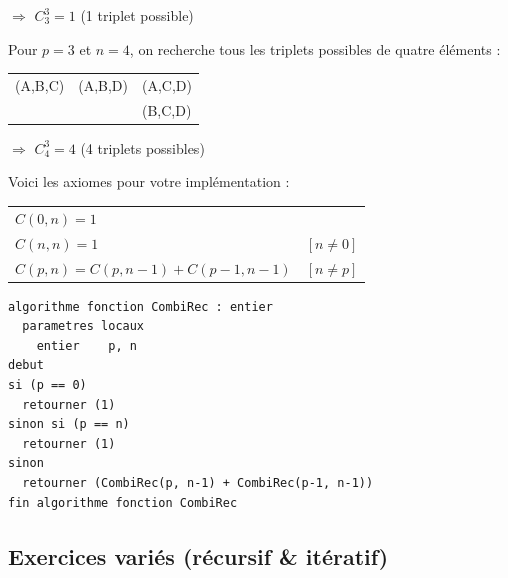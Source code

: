 \documentclass[11pt,a4paper]{article}
\begin{document}
\hspace*{3cm} $\Rightarrow$ $ C^{3}_{3} = 1 $ \hspace*{1cm} (1 triplet possible)

\bigskip

Pour $ p = 3 $ et $ n = 4 $, on recherche tous les triplets possibles de quatre éléments :

\begin{table}[h!]
  \centering
  \begin{tabular}{l l l}
(A,B,C) & (A,B,D) & (A,C,D) \\
        &         & (B,C,D) \\
  \end{tabular}
\end{table}

\hspace*{3cm} $\Rightarrow$ $ C^{3}_{4} = 4 $ \hspace*{1cm} (4 triplets possibles)

\bigskip

Voici les axiomes pour votre implémentation :

\begin{table}[h!]
  \centering
  \begin{tabular}{l l}
$ C(0,n) = 1 $                             & \\
$ C(n,n) = 1 $                             & $ [n \neq 0] $ \\
$ C(p,n) = C(p, n - 1) + C(p - 1, n - 1) $ & $ [n \neq p] $ \\
  \end{tabular}
\end{table}


\begin{table}[ht!]
  \centering
\begin{lstlisting}[style=algorithmique]
algorithme fonction CombiRec : entier
  parametres locaux
    entier    p, n
debut
si (p == 0)
  retourner (1)
sinon si (p == n)
  retourner (1)
sinon
  retourner (CombiRec(p, n-1) + CombiRec(p-1, n-1))
fin algorithme fonction CombiRec \end{lstlisting}
\end{table}


\newpage


\subsection{Exercices variés (récursif \& itératif)}
\end{document}
